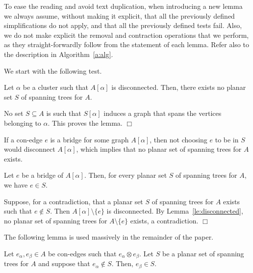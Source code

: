 \documentclass[letter,runningheads]{llncs}
\renewenvironment{proof}
{{\em Proof.\ }}{\hspace*{\fill}$\Box$\par\vspace{2mm}}
\newcommand{\conf}{\otimes}
\begin{document}
To ease the reading and avoid text duplication, when introducing a new lemma we always assume, without making it explicit, that all the previously defined simplifications do not apply, and that all the previously defined tests fail. Also, we do not make explicit the removal and contraction operations that we perform, as they straight-forwardly follow from the statement of each lemma. Refer also to the description in Algorithm~\ref{a:alg}.

We start with the following test.

\begin{lemma}[{\sc Test 1}]\label{le:disconnected}
Let $\alpha$ be a cluster such that $A[\alpha]$ is disconnected. Then, there exists no planar set $S$ of spanning trees for $A$.
\end{lemma}

\begin{proof}
No set $S\subseteq A$ is such that $S[\alpha]$ induces a graph that spans the vertices belonging to $\alpha$. This proves the lemma.
\end{proof}


If a con-edge $e$ is a bridge for some graph $A[\alpha]$, then not choosing $e$ to be in $S$ would disconnect $A[\alpha]$, which implies that no planar set of spanning trees for $A$ exists.

\begin{lemma}[{\sc Simplification 1}]\label{le:bridge}
Let $e$ be a bridge of $A[\alpha]$. Then, for every planar set $S$ of spanning trees for $A$, we have $e\in S$.
\end{lemma}

\begin{proof}
Suppose, for a contradiction, that a planar set $S$ of spanning trees for $A$ exists such that $e\notin S$. Then $A[\alpha]\setminus\{e\}$ is disconnected. By Lemma~\ref{le:disconnected}, no planar set of spanning trees for $A\setminus\{e\}$ exists, a contradiction.
\end{proof}



The following lemma is used massively in the remainder of the paper.

\begin{lemma} \label{le:one-or-the-other}
Let $e_{\alpha},e_{\beta}\in A$ be con-edges such that $e_{\alpha}\conf e_{\beta}$. Let $S$ be a planar set of spanning trees for $A$ and suppose that $e_{\alpha} \notin S$. Then, $e_{\beta} \in S$.
\end{lemma}
\end{document}
